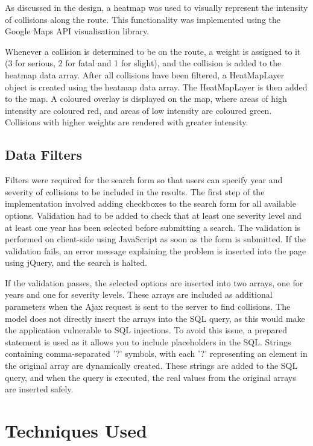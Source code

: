 \documentclass[authoryearcitations]{UoYCSproject}
\begin{document}
As discussed in the design, a heatmap was used to visually represent the intensity of collisions along the route. This functionality was implemented using the Google Maps API visualisation library.

Whenever a collision is determined to be on the route, a weight is assigned to it (3 for serious, 2 for fatal and 1 for slight), and the collision is added to the heatmap data array. After all collisions have been filtered, a HeatMapLayer object is created using the heatmap data array. The HeatMapLayer is then added to the map. A coloured overlay is displayed on the map, where areas of high intensity are coloured red, and areas of low intensity are coloured green. Collisions with higher weights are rendered with greater intensity.

\subsection{Data Filters}

Filters were required for the search form so that users can specify year and severity of collisions to be included in the results. The first step of the implementation involved adding checkboxes to the search form for all available options. Validation had to be added to check that at least one severity level and at least one year has been selected before submitting a search. The validation is performed on client-side using JavaScript as soon as the form is submitted. If the validation fails, an error message explaining the problem is inserted into the page using jQuery, and the search is halted. 

If the validation passes, the selected options are inserted into two arrays, one for years and one for severity levels. These arrays are included as additional parameters when the Ajax request is sent to the server to find collisions. The model does not directly insert the arrays into the SQL query, as this would make the application vulnerable to SQL injections. To avoid this issue, a prepared statement is used as it allows you to include placeholders in the SQL. Strings containing comma-separated '?' symbols, with each '?' representing an element in the original array are dynamically created. These strings are added to the SQL query, and when the query is executed, the real values from the original arrays are inserted safely.

\section{Techniques Used}
\end{document}
